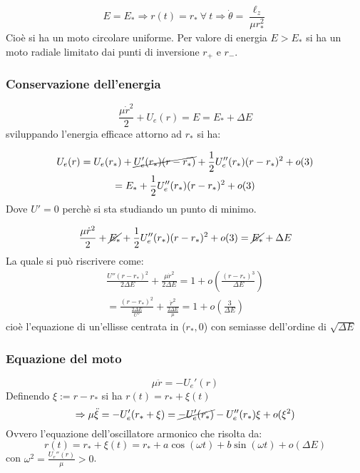 \documentclass[Main.tex]{subfiles}
\begin{document}
\begin{equation}
  E=E_* \Rightarrow r(t) = r_* \ \forall \ t  \Rightarrow \dot \theta = \frac{\ell_z}{ \mu r_*^2}
\end{equation}
Cioè si ha un moto circolare uniforme. Per valore di energia $E>E_*$ si ha un moto radiale limitato dai punti di inversione $r_+$ e $r_-$.

	\subsubsection*{Conservazione dell'energia}
	
	\begin{equation}
		 \frac{\mu \dot r^2}{2} + U_e(r) = E = E_*+ \Delta E
	\end{equation}
	sviluppando l'energia efficace attorno ad $r_*$ si ha:
	
	\begin{gather}
		U_e(r) = U_e(r_*) + \cancel{U'_e(r_*) (r-r_*)} + \frac{1}{2} U_e'' (r_*) (r-r_*)^2 + o(3)\\
		= E_* + \frac{1}{2} U_e''(r_*) (r-r_*)^2+o(3)
	\end{gather}
	Dove $U'=0$ perchè si sta studiando un punto di minimo.
	
	\begin{equation}
		\frac{\mu \dot r^2}{2} + \cancel{E_*} + \frac{1}{2} U_e''(r_*) (r-r_*)^2 + o(3) = \cancel{E_*} + \Delta E
	\end{equation}
	La quale si può riscrivere come:
	\begin{gather}
		\frac{U'' (r-r_*)^2}{2 \Delta E} + \frac{\mu \dot r^2}{2 \Delta E} = 1+ o \left( \frac{(r-r_*)^3}{\Delta E} \right)\\
		= \frac{(r-r_*)^2}{\frac{2 \Delta E}{U''}} + \frac{\dot r^2}{\frac{2 \Delta E}{\mu}} = 1+ o \left( \frac{3}{\Delta E} \right)
	\end{gather}
	cioè l'equazione di un'ellisse centrata in ($r_*,0$) con semiasse dell'ordine di $\sqrt{\Delta E}$
	
	\newpage
	\subsubsection*{Equazione del moto}
	
	\begin{equation}
		\mu \ddot r= - U_e'(r)
	\end{equation}
	Definendo $\xi:= r-r_*$ si ha $r(t)=r_* + \xi(t)$
	\begin{equation}
		\Rightarrow \mu \ddot \xi = - U_e'(r_* + \xi ) = \cancel{- U_e'(r_*)} - U_e''( r_*) \xi + o(\xi ^2)
	\end{equation}
	Ovvero l'equazione dell'oscillatore armonico che risolta da:
	\begin{equation}
		r(t) = r_* + \xi(t) = r_* + a \cos ( \omega t ) + b \sin (\omega t) + o ( \Delta E)
	\end{equation}
	con $\omega^2 = \frac{U_e''(r)}{\mu} >0$.
	
\end{document}
